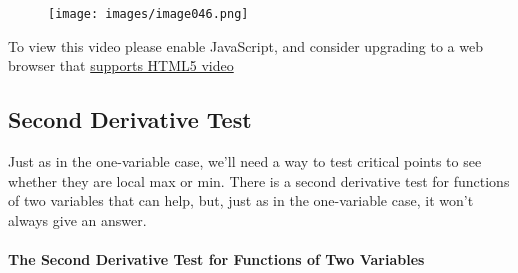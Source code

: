 \begin{figure}
\centering
\texttt{[image: images/image046.png]}
\caption{}
\end{figure}

To view this video please enable JavaScript, and consider upgrading to a
web browser that \href{http://videojs.com/html5-video-support/}{supports
HTML5 video}

\hypertarget{second-derivative-test}{%
\subsection{Second Derivative Test}\label{second-derivative-test}}

Just as in the one-variable case, we'll need a way to test critical
points to see whether they are local max or min. There is a second
derivative test for functions of two variables that can help, but, just
as in the one-variable case, it won't always give an answer.

\hypertarget{the-second-derivative-test-for-functions-of-two-variables}{%
\paragraph{The Second Derivative Test for Functions of Two
Variables}\label{the-second-derivative-test-for-functions-of-two-variables}}

